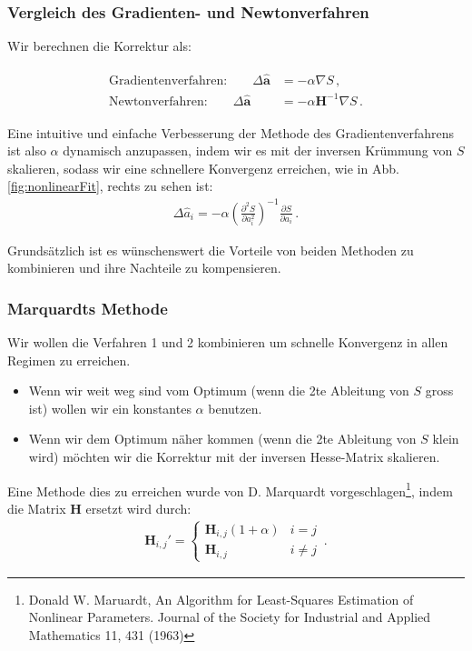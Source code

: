 \subsubsection{Vergleich des Gradienten- und Newtonverfahren}
\label{subsubsec:vl9-3}

Wir berechnen die Korrektur als:

\begin{align}
\begin{split}
\text{Gradientenverfahren:}\quad \quad \Delta \boldsymbol{\hat{a}} &= -\alpha \nabla S\,,\\
\text{Newtonverfahren:}\quad \quad \Delta \boldsymbol{\hat{a}} &= -\alpha \boldsymbol{H}^{-1} \nabla S\,.
\label{eq:vl9-14}
\end{split}
\end{align}

Eine intuitive und einfache Verbesserung der Methode des Gradientenverfahrens ist also $\alpha$ dynamisch anzupassen, indem wir es mit der inversen Kr\"ummung von $S$ skalieren, sodass wir eine schnellere Konvergenz erreichen, wie in Abb. \ref{fig:nonlinearFit}, rechts zu sehen ist:
\begin{align}
\Delta \hat{a}_i = -\alpha \left( \frac{ \partial^2 S }{ \partial a_i^2 } \right)^{-1} \frac{ \partial S }{ \partial a_i }\,.
\label{eq:vl9-15}
\end{align}

Grunds\"atzlich ist es w\"unschenswert die Vorteile von beiden Methoden zu kombinieren und ihre Nachteile zu kompensieren.


\subsubsection{Marquardts Methode}
\label{subsubsec:vl9-4}

Wir wollen die Verfahren 1 und 2 kombinieren um schnelle Konvergenz in allen Regimen zu erreichen.
\begin{itemize}
    \setlength\itemsep{0em}
        \item Wenn wir weit weg sind vom Optimum (wenn die 2te Ableitung von $S$ gross ist) wollen wir ein konstantes $\alpha$ benutzen.
        \item Wenn wir dem Optimum n\"aher kommen (wenn die 2te Ableitung von $S$ klein wird) m\"ochten wir die Korrektur mit der inversen Hesse-Matrix skalieren.
\end{itemize}

Eine Methode dies zu erreichen wurde von D. Marquardt vorgeschlagen\footnote{Donald W. Maruardt, An Algorithm for Least-Squares Estimation of Nonlinear Parameters. Journal of the Society for Industrial and Applied Mathematics 11, 431 (1963)}, indem die Matrix $\boldsymbol{H}$ ersetzt wird durch:
\begin{align}
\boldsymbol{H}_{i,j}' =
    \begin{cases}
        \boldsymbol{H}_{i,j} (1 + \alpha) &i = j \\
        \boldsymbol{H}_{i,j} &i \neq j 
    \end{cases}\,.       
\label{eq:vl9-16}
\end{align}

